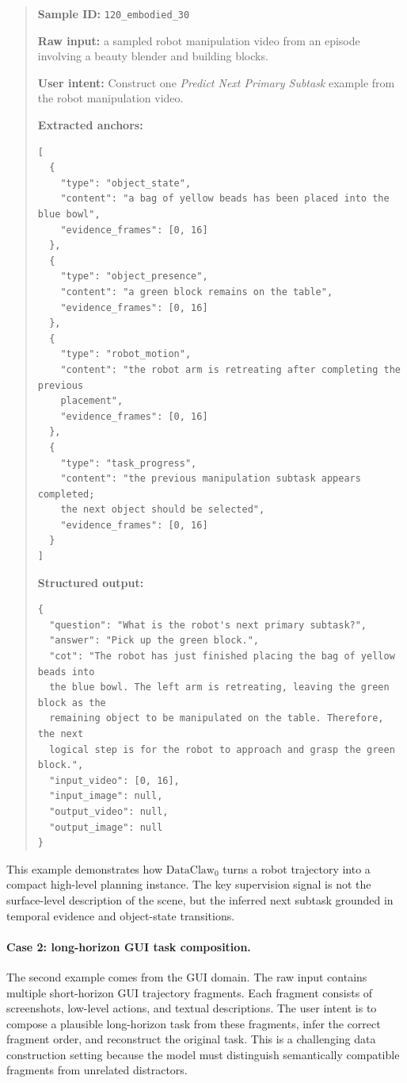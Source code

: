\begin{quote}
\small
\textbf{Sample ID:} \texttt{120\_embodied\_30}

\textbf{Raw input:} a sampled robot manipulation video from an episode involving a beauty blender and building blocks.

\textbf{User intent:} Construct one \emph{Predict Next Primary Subtask} example from the robot manipulation video.

\textbf{Extracted anchors:}
\begin{verbatim}
[
  {
    "type": "object_state",
    "content": "a bag of yellow beads has been placed into the blue bowl",
    "evidence_frames": [0, 16]
  },
  {
    "type": "object_presence",
    "content": "a green block remains on the table",
    "evidence_frames": [0, 16]
  },
  {
    "type": "robot_motion",
    "content": "the robot arm is retreating after completing the previous
    placement",
    "evidence_frames": [0, 16]
  },
  {
    "type": "task_progress",
    "content": "the previous manipulation subtask appears completed;
    the next object should be selected",
    "evidence_frames": [0, 16]
  }
]
\end{verbatim}

\textbf{Structured output:}
\begin{verbatim}
{
  "question": "What is the robot's next primary subtask?",
  "answer": "Pick up the green block.",
  "cot": "The robot has just finished placing the bag of yellow beads into
  the blue bowl. The left arm is retreating, leaving the green block as the
  remaining object to be manipulated on the table. Therefore, the next
  logical step is for the robot to approach and grasp the green block.",
  "input_video": [0, 16],
  "input_image": null,
  "output_video": null,
  "output_image": null
}
\end{verbatim}
\end{quote}

This example demonstrates how $\text{DataClaw}_0$ turns a robot trajectory into a compact high-level planning instance. The key supervision signal is not the surface-level description of the scene, but the inferred next subtask grounded in temporal evidence and object-state transitions.

\paragraph{Case 2: long-horizon GUI task composition.}
The second example comes from the GUI domain. The raw input contains multiple short-horizon GUI trajectory fragments. Each fragment consists of screenshots, low-level actions, and textual descriptions. The user intent is to compose a plausible long-horizon task from these fragments, infer the correct fragment order, and reconstruct the original task. This is a challenging data construction setting because the model must distinguish semantically compatible fragments from unrelated distractors.

